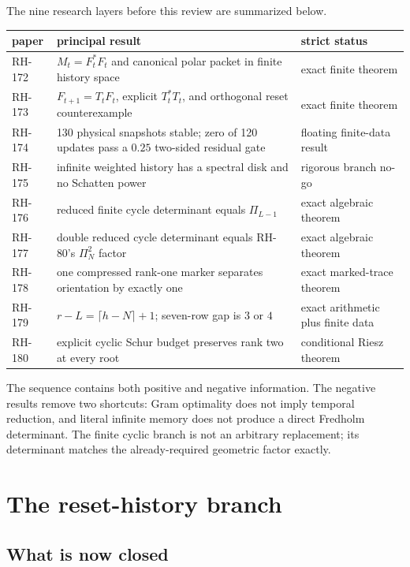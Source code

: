 \documentclass[12pt]{article}
\theoremstyle{remark}
\begin{document}
The nine research layers before this review are summarized below.
\begin{center}
\small
\begin{tabular}{p{}p{}p{}}
\toprule
paper & principal result & strict status\\
\midrule
RH-172 & $M_t=F_t^*F_t$ and canonical polar packet in finite history space & exact finite theorem\\
RH-173 & $F_{t+1}=T_tF_t$, explicit $T_t^*T_t$, and orthogonal reset counterexample & exact finite theorem\\
RH-174 & 130 physical snapshots stable; zero of 120 updates pass a $0.25$ two-sided residual gate & floating finite-data result\\
RH-175 & infinite weighted history has a spectral disk and no Schatten power & rigorous branch no-go\\
RH-176 & reduced finite cycle determinant equals $\Pi_{L-1}$ & exact algebraic theorem\\
RH-177 & double reduced cycle determinant equals RH-80's $\Pi_N^2$ factor & exact algebraic theorem\\
RH-178 & one compressed rank-one marker separates orientation by exactly one & exact marked-trace theorem\\
RH-179 & $r-L=\lceil h-N\rceil+1$; seven-row gap is $3$ or $4$ & exact arithmetic plus finite data\\
RH-180 & explicit cyclic Schur budget preserves rank two at every root & conditional Riesz theorem\\
\bottomrule
\end{tabular}
\end{center}
The sequence contains both positive and negative information.  The negative
results remove two shortcuts: Gram optimality does not imply temporal
reduction, and literal infinite memory does not produce a direct Fredholm
determinant.  The finite cyclic branch is not an arbitrary replacement; its
determinant matches the already-required geometric factor exactly.

\section{The reset-history branch}

\subsection{What is now closed}
\end{document}
